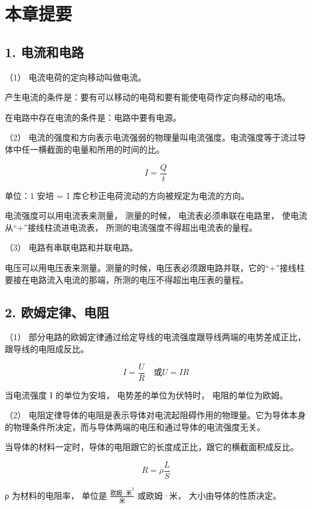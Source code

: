 \section{本章提要}\label{ux672cux7ae0ux63d0ux8981-1}

\subsection{1. 电流和电路}\label{ux7535ux6d41ux548cux7535ux8def-1}

（1） 电流电荷的定向移动叫做电流。

产生电流的条件是：要有可以移动的电荷和要有能使电荷作定向移动的电场。

在电路中存在电流的条件是：电路中要有电源。

（2）
电流的强度和方向表示电流强弱的物理量叫电流强度。电流强度等于流过导体中任一横截面的电量和所用的时间的比。

\[
I = \frac{Q}{t}
\]

单位：1 安培 = 1 库仑秒正电荷流动的方向被规定为电流的方向。

电流强度可以用电流表来测量， 测量的时候， 电流表必须串联在电路里，
使电流从``+''接线柱流进电流表， 所测的电流强度不得超出电流表的量程。

（3） 电路有串联电路和并联电路。

电压可以用电压表来测量。测量的时候，电压表必须跟电路并联，它的``+''接线柱要接在电路流入电流的那端，所测的电压不得超出电压表的量程。

\subsection{2.
欧姆定律、电阻}\label{ux6b27ux59c6ux5b9aux5f8bux7535ux963b-1}

（1） 部分电路的欧姆定律通过给定导线的电流强度跟导线两端的电势差成正比，
跟导线的电阻成反比。

\[
I = \frac{U}{R} \quad \text{或} U = I R
\]

当电流强度 I 的单位为安培， 电势差的单位为伏特时， 电阻的单位为欧姆。

（2）
电阻定律导体的电阻是表示导体对电流起阻碍作用的物理量。它为导体本身的物理条件所决定，而与导体两端的电压和通过导体的电流强度无关。

当导体的材料一定时，导体的电阻跟它的长度成正比，跟它的横截面积成反比。

\[
R = \rho \frac{L}{S}
\]

ρ 为材料的电阻率， 单位是
\(\frac{\text{欧姆} \cdot \text{米}^{2}}{\text{米}}\) 或欧姆·米，
大小由导体的性质决定。

